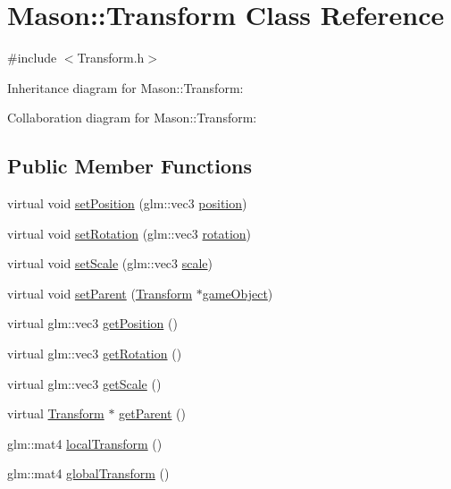 \hypertarget{class_mason_1_1_transform}{}\section{Mason\+:\+:Transform Class Reference}
\label{class_mason_1_1_transform}


{\ttfamily \#include $<$Transform.\+h$>$}



Inheritance diagram for Mason\+:\+:Transform\+:


Collaboration diagram for Mason\+:\+:Transform\+:
\subsection*{Public Member Functions}
\begin{DoxyCompactItemize}
\item 
virtual void \hyperlink{class_mason_1_1_transform_a740f389e20c0190c52bcb893aeaa0490}{set\+Position} (glm\+::vec3 \hyperlink{class_mason_1_1_transform_ac9e11b4ec4433a38ac1100f12c955dcb}{position})
\item 
virtual void \hyperlink{class_mason_1_1_transform_aacc2b668bdd1d9b978aa0edccf75144a}{set\+Rotation} (glm\+::vec3 \hyperlink{class_mason_1_1_transform_ae2f541ade79d561584619e93edb034ae}{rotation})
\item 
virtual void \hyperlink{class_mason_1_1_transform_a4a273ac58f45b6ee9cf2b37cf661daac}{set\+Scale} (glm\+::vec3 \hyperlink{class_mason_1_1_transform_a4618b31e34a6ec8a0ee638401fc56367}{scale})
\item 
virtual void \hyperlink{class_mason_1_1_transform_a6e1a6b57214a7de21595e6af8b05138b}{set\+Parent} (\hyperlink{class_mason_1_1_transform}{Transform} $\ast$\hyperlink{class_mason_1_1_component_a30030370c35f5562cbbbb0927b0448c8}{game\+Object})
\item 
virtual glm\+::vec3 \hyperlink{class_mason_1_1_transform_a0b21f641e72d7b55f3a630b986d0b106}{get\+Position} ()
\item 
virtual glm\+::vec3 \hyperlink{class_mason_1_1_transform_a7367502d4344eff2d88a250084ae19dc}{get\+Rotation} ()
\item 
virtual glm\+::vec3 \hyperlink{class_mason_1_1_transform_a24107560725b250c4c2e10ab98a6ac04}{get\+Scale} ()
\item 
virtual \hyperlink{class_mason_1_1_transform}{Transform} $\ast$ \hyperlink{class_mason_1_1_transform_ae3e8acbd25d7d171aff00da038f79a9a}{get\+Parent} ()
\item 
glm\+::mat4 \hyperlink{class_mason_1_1_transform_a8b85abc03488f58bef8bb78df77c1689}{local\+Transform} ()
\item 
glm\+::mat4 \hyperlink{class_mason_1_1_transform_a35e627aa09604bf3a81f4c07d28205f3}{global\+Transform} ()
\end{DoxyCompactItemize}
